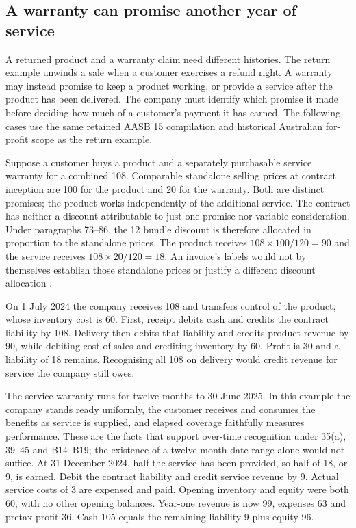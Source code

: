 \subsection{A warranty can promise another year of service}
\label{sec:service-warranty}

A returned product and a warranty claim need different histories. The return
example unwinds a sale when a customer exercises a refund right. A warranty
may instead promise to keep a product working, or provide a service after the
product has been delivered. The company must identify which promise it made
before deciding how much of a customer's payment it has earned. The following
cases use the same retained AASB 15 compilation and historical Australian
for-profit scope as the return example.

Suppose a customer buys a product and a separately purchasable service warranty
for a combined 108. Comparable standalone selling prices at contract inception
are 100 for the product and 20 for the warranty. Both are distinct promises;
the product works independently of the additional service. The contract has
neither a discount attributable to just one promise nor variable consideration.
Under paragraphs 73--86, the 12 bundle discount is therefore allocated in
proportion to the standalone prices. The product receives
$108\times100/120=90$ and the service receives $108\times20/120=18$.
An invoice's labels would not by themselves establish those standalone prices
or justify a different discount allocation \citep{aasb15dated}.

On 1 July 2024 the company receives 108 and transfers control of the product,
whose inventory cost is 60. First, receipt debits cash and credits the contract
liability by 108. Delivery then debits that liability and credits product
revenue by 90, while debiting cost of sales and crediting inventory by 60.
Profit is 30 and a liability of 18 remains. Recognising all 108 on delivery
would credit revenue for service the company still owes.

The service warranty runs for twelve months to 30 June 2025. In this example
the company stands ready uniformly, the customer receives and consumes the
benefits as service is supplied, and elapsed coverage faithfully measures
performance. These are the facts that support over-time recognition under
35(a), 39--45 and B14--B19; the existence of a twelve-month date range alone
would not suffice. At 31 December 2024, half the service has been provided,
so half of 18, or 9, is earned. Debit the contract liability and credit
service revenue by 9. Actual service costs of 3 are expensed and paid.
Opening inventory and equity were both 60, with no other opening balances.
Year-one revenue is now 99, expenses 63 and pretax profit 36. Cash 105 equals
the remaining liability 9 plus equity 96.

